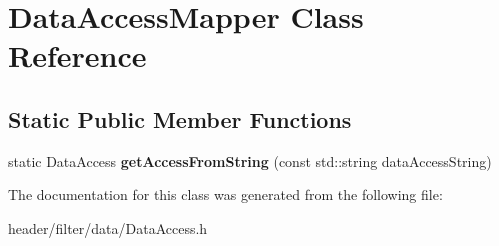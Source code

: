\hypertarget{class_data_access_mapper}{}\section{Data\+Access\+Mapper Class Reference}
\label{class_data_access_mapper}
\subsection*{Static Public Member Functions}
\begin{DoxyCompactItemize}
\item 
\mbox{\label{class_data_access_mapper_a4d16c181c23488bad84b5276ff2621c5}} 
static Data\+Access {\bfseries get\+Access\+From\+String} (const std\+::string data\+Access\+String)
\end{DoxyCompactItemize}


The documentation for this class was generated from the following file\+:\begin{DoxyCompactItemize}
\item 
header/filter/data/Data\+Access.\+h\end{DoxyCompactItemize}
